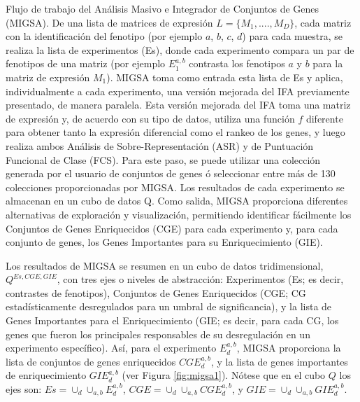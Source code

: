 \documentclass[12pt,twoside]{reedthesis}
\begin{document}
Flujo de trabajo del Análisis Masivo e Integrador de Conjuntos de Genes (MIGSA). De una lista de matrices de expresión \(L=\{M_1,....,M_D\}\), cada matriz con la identificación del fenotipo (por ejemplo \(a\), \(b\), \(c\), \(d\)) para cada muestra, se realiza la lista de experimentos (Es), donde cada experimento compara un par de fenotipos de una matriz (por ejemplo \(E_{1}^{a,b}\) contrasta los fenotipos \(a\) y \(b\) para la matriz de expresión \(M_1\)). MIGSA toma como entrada esta lista de Es y aplica, individualmente a cada experimento, una versión mejorada del IFA previamente presentado, de manera paralela. Esta versión mejorada del IFA toma una matriz de expresión y, de acuerdo con su tipo de datos, utiliza una función \(f\) diferente para obtener tanto la expresión diferencial como el rankeo de los genes, y luego realiza ambos Análisis de Sobre-Representación (ASR) y de Puntuación Funcional de Clase (FCS). Para este paso, se puede utilizar una colección generada por el usuario de conjuntos de genes ó seleccionar entre más de 130 colecciones proporcionadas por MIGSA. Los resultados de cada experimento se almacenan en un cubo de datos Q. Como salida, MIGSA proporciona diferentes alternativas de exploración y visualización, permitiendo identificar fácilmente los Conjuntos de Genes Enriquecidos (CGE) para cada experimento y, para cada conjunto de genes, los Genes Importantes para su Enriquecimiento (GIE).



\par

Los resultados de MIGSA se resumen en un cubo de datos tridimensional, \(Q^{Es,CGE,GIE}\), con tres ejes o niveles de abstracción: Experimentos (Es; es decir, contrastes de fenotipos), Conjuntos de Genes Enriquecidos (CGE; CG estadísticamente desregulados para un umbral de significancia), y la lista de Genes Importantes para el Enriquecimiento (GIE; es decir, para cada CG, los genes que fueron los principales responsables de su desregulación en un experimento específico). Así, para el experimento \(E_{d}^{a,b}\), MIGSA proporciona la lista de conjuntos de genes enriquecidos \(CGE_{d}^{a,b}\), y la lista de genes importantes de enriquecimiento \(GIE_{d}^{a,b}\) (ver Figura \ref{fig:migsa1}). Nótese que en el cubo \(Q\) los ejes son: \(Es=\cup_d\cup_{a,b}E_{d}^{a,b}\), \(CGE=\cup_d\cup_{a,b}CGE_{d}^{a,b}\), y \(GIE=\cup_d\cup_{a,b}GIE_{d}^{a,b}\).

\par
\end{document}
